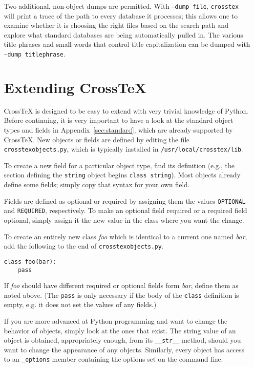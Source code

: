 \documentclass{article}
\newcommand{\XTX}{Cross\TeX}
\begin{document}
Two additional, non-object dumps are permitted.  With \texttt{--dump~file},
\texttt{crosstex} will print a trace of the path to every database it
processes; this allows one to examine whether it is choosing the right files
based on the search path and explore what standard databases are being
automatically pulled in.  The various title phrases and small words that
control title capitalization can be dumped with \texttt{--dump~titlephrase}.


\section{Extending \XTX{}\label{sec:extending}}

\XTX{} is designed to be easy to extend with very trivial knowledge
of Python. Before continuing, it is very important to have a look at
the standard object types and fields in Appendix~\ref{sec:standard},
which are already supported by \XTX{}. New objects or fields are defined
by editing the file \texttt{crosstexobjects.py}, which is typically
installed in \texttt{/usr/local/crosstex/lib}.

To create a new field for a particular object type, find its definition
(e.g., the section defining the \texttt{string} object begins
\texttt{class string}). Most objects already define some fields;
simply copy that syntax for your own field.

Fields are defined as optional or required by assigning them the
values \texttt{OPTIONAL} and \texttt{REQUIRED}, respectively.  To make
an optional field required or a required field optional, simply assign
it the new value in the class where you want the change.

To create an entirely new class \textit{foo} which is identical to
a current one named \textit{bar}, add the following to the end of
\texttt{crosstexobjects.py}.

\begin{small}\begin{verbatim}
class foo(bar):
    pass
\end{verbatim}\end{small}

If \textit{foo} should have different required or optional fields form
\textit{bar}, define them as noted above. (The \texttt{pass} is only
necessary if the body of the \texttt{class} definition is empty, e.g. it
does not set the values of any fields.)

If you are more advanced at Python programming and want to change
the behavior of objects, simply look at the ones that exist. The
string value of an object is obtained, appropriately enough, from its
\texttt{\_\_str\_\_} method, should you want to change the appearance of
any objects. Similarly, every object has access to an \texttt{\_options}
member containing the options set on the command line.
\end{document}
